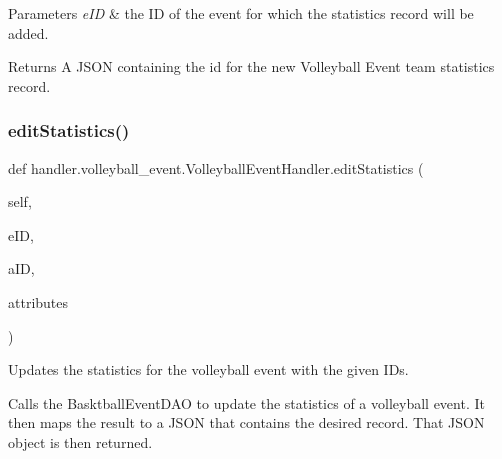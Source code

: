 \begin{DoxyParams}{Parameters}
{\em e\+ID} & the ID of the event for which the statistics record will be added.\\
\hline
\end{DoxyParams}
\begin{DoxyReturn}{Returns}
A J\+S\+ON containing the id for the new Volleyball Event team statistics record. 
\end{DoxyReturn}
\mbox{\label{classhandler_1_1volleyball__event_1_1_volleyball_event_handler_a842f7dcd5852874aad1cf8ed07028d5e}} 
\subsubsection{\texorpdfstring{edit\+Statistics()}{editStatistics()}}
{\footnotesize\ttfamily def handler.\+volleyball\+\_\+event.\+Volleyball\+Event\+Handler.\+edit\+Statistics (\begin{DoxyParamCaption}\item[{}]{self,  }\item[{}]{e\+ID,  }\item[{}]{a\+ID,  }\item[{}]{attributes }\end{DoxyParamCaption})}



Updates the statistics for the volleyball event with the given I\+Ds. 

Calls the Basktball\+Event\+D\+AO to update the statistics of a volleyball event. It then maps the result to a J\+S\+ON that contains the desired record. That J\+S\+ON object is then returned.


